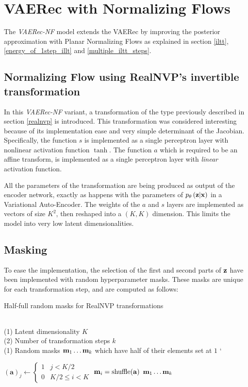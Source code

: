 \section{VAERec with Normalizing Flows}

The \emph{VAERec-NF} model
extends the VAERec by improving the posterior approximation
with Planar Normalizing Flows \cite{1505.05770}
as explained in section \ref{iltt}, 
\ref{energy_of_1step_illt}
and \ref{multiple_iltt_steps}.

\subsection{Normalizing Flow using RealNVP's invertible transformation}

In this \emph{VAERec-NF} variant, a transformation of the type previously described
in section \ref{realnvp} is introduced.
This transformation was considered interesting 
because of its implementation
ease and very simple determinant of the Jacobian.
Specifically, the function $s$ is implemented as
a single perceptron layer with nonlinear activation function 
$\tanh$. The function $a$ which is required to be an affine transform,
is implemented as a single perceptron layer with \emph{linear}
activation function.

All the parameters of the transformation are being produced as output of the
encoder network, exactly as happens with the parameters of $p_\theta\left(\mathbf{z}|\mathbf{x}\right)$ in a Variational
Auto-Encoder.
The weights of the $a$ and $s$ layers are implemented as vectors of size $K^2$, then
reshaped into a $(K,K)$ dimension. This limits the model into
very low latent dimensionalities.

\subsection{Masking}

To ease the implementation, the selection of the first and second parts of $\mathbf{z}$
have been implemented with random hyperparameter masks. These masks are unique for each transformation
step, and are computed as follows:

\begin{algorithm}[H]
\caption{Half-full random masks for RealNVP transformations}
\begin{algorithmic}[1]

\REQUIRE ~~\\
(1) Latent dimensionality $K$ \\
(2) Number of transformation steps $k$
\ENSURE~~\\
(1) Random masks $\mathbf{m}_1 \ldots \mathbf{m}_k$ which have half of their elements set at $1$
`
\item[]
\STATE $(\mathbf{a})_j \leftarrow \left\{\begin{array}{ll} 1 & j < K/2 \\ 0 & K/2 \leq i < K\end{array}\right.$
\STATE $\mathbf{m}_i = \mathrm{shuffle}(\mathbf{a})$
\ENDFOR
\RETURN $\mathbf{m}_1 \ldots \mathbf{m}_k$
\end{algorithmic}
\end{algorithm}
                                         
